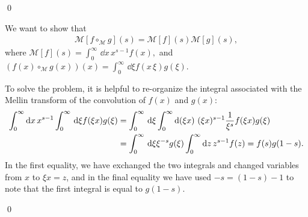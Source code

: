 \qed{}


We want to show that
\begin{align}
    \mathcal M[f \circ_{\mathcal M} g](s) = \mathcal M[f](s) \mathcal M[g](s)
    ,
\end{align}
where
\(
    \mathcal{M}[f](s) = \int_0^\infty \,\dd x\, x^{s-1} f(x)
    ,
\)
and
\(
    (f(x) \circ_{\mathcal M} g(x))(x)
    =
    \int_0^\infty\,\dd\xi f(x\,\xi) g(\xi)
    .
\)


To solve the problem, it is helpful to re-organize the integral associated with the Mellin transform of the convolution of \(f(x)\) and \(g(x)\):
\begin{align}
    \int_0^\infty \dd x\, x^{s-1}
    \int_0^\infty \, \dd \xi
    f(\xi x) g(\xi)
    &=
    \int_0^\infty \, \dd \xi
    \int_0^\infty \dd (\xi x)\, (\xi x)^{s-1}
    \frac{1}{\xi^s}
    f(\xi x) g(\xi)
    \\
    \notag
    &=
    \int_0^\infty \, \dd \xi
    \xi^{-s}
    g(\xi)
    \int_0^\infty \dd z\, z^{s-1}
    f(z)
    =
    f(s) g(1-s)
    .
\end{align}
In the first equality, we have exchanged the two integrals and changed variables from \(x\) to \(\xi x = z\), and in the final equality we have used \(-s = (1-s) - 1\) to note that the first integral is equal to \(g(1-s)\).

\qed{}
\fi


\endgroup
